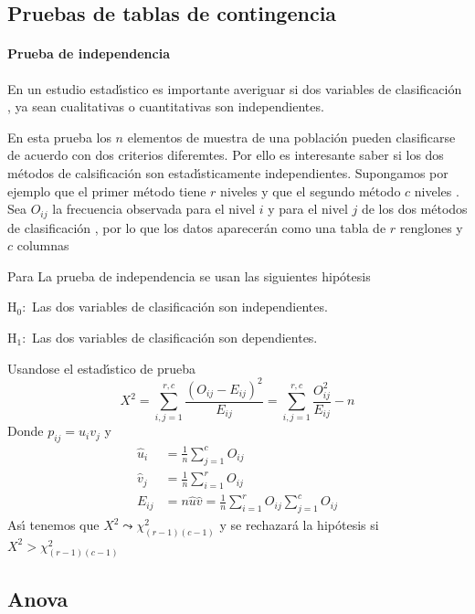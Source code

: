 \subsection{Pruebas de tablas de contingencia}

\paragraph{Prueba de independencia}

En un estudio estad\'{\i}stico es importante averiguar si dos variables de
clasificaci\'{o}n , ya sean cualitativas o cuantitativas son independientes.

En esta prueba los $n$ elementos de muestra de una poblaci\'{o}n pueden
clasificarse de acuerdo con dos criterios diferemtes. Por ello es interesante
saber si los dos m\'{e}todos de calsificaci\'{o}n son estad\'{\i}sticamente
independientes. Supongamos por ejemplo que el primer m\'{e}todo tiene $r$
niveles y que el segundo m\'{e}todo $c$ niveles . Sea $O_{ij}$ la frecuencia
observada para el nivel $i$ y para el nivel $j$ de los dos m\'{e}todos de
clasificaci\'{o}n , por lo que los datos aparecer\'{a}n como una tabla de $r$
renglones y $c$ columnas

Para La prueba de independencia se usan las siguientes hip\'{o}tesis

H$_{0}:$ Las dos variables de clasificaci\'{o}n son independientes.

H$_{1}:$ Las dos variables de clasificaci\'{o}n son dependientes.

Usandose el estad\'{\i}stico de prueba
\[
X^{2}=\sum_{i,j=1}^{r,c}\frac{\left(  O_{ij}-E_{ij}\right)  ^{2}}{E_{ij}}%
=\sum_{i,j=1}^{r,c}\frac{O_{ij}^{2}}{E_{ij}}-n
\]
Donde $p_{ij}=u_{i}v_{j}$ y
\begin{align*}
\hat{u}_{i}  &  =\frac{1}{n}\sum_{j=1}^{c}O_{ij}\\
\hat{v}_{j}  &  =\frac{1}{n}\sum_{i=1}^{r}O_{ij}\\
E_{ij}  &  =n\hat{u}\hat{v}=\frac{1}{n}\sum_{i=1}^{r}O_{ij}\sum_{j=1}%
^{c}O_{ij}%
\end{align*}
As\'{\i} tenemos que $X^{2}\leadsto\chi_{\left(  r-1\right)  \left(
c-1\right)  }^{2}$ y se rechazar\'{a} la hip\'{o}tesis si $X^{2}>\chi_{\left(
r-1\right)  \left(  c-1\right)  }^{2}$

\subsection{Anova}

